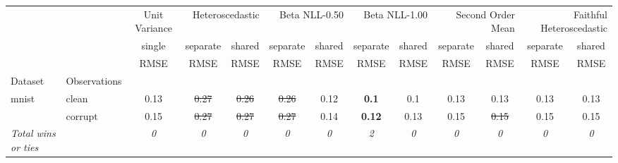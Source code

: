 \begin{tabular}{ll|c|cc|cc|cc|cc|cc}
\toprule
{} & {} & {Unit Variance} & \multicolumn{2}{r}{Heteroscedastic} & \multicolumn{2}{r}{Beta NLL-0.50} & \multicolumn{2}{r}{Beta NLL-1.00} & \multicolumn{2}{r}{Second Order Mean} & \multicolumn{2}{r}{Faithful Heteroscedastic} \\
{} & {} & {single} & {separate} & {shared} & {separate} & {shared} & {separate} & {shared} & {separate} & {shared} & {separate} & {shared} \\
{} & {} & {RMSE} & {RMSE} & {RMSE} & {RMSE} & {RMSE} & {RMSE} & {RMSE} & {RMSE} & {RMSE} & {RMSE} & {RMSE} \\
{Dataset} & {Observations} & {} & {} & {} & {} & {} & {} & {} & {} & {} & {} & {} \\
\midrule
\multirow[t]{2}{*}{mnist} & clean & 0.13 & \sout{0.27} & \sout{0.26} & \sout{0.26} & 0.12 & \textbf{0.1} & 0.1 & 0.13 & 0.13 & 0.13 & 0.13 \\
 & corrupt & 0.15 & \sout{0.27} & \sout{0.27} & \sout{0.27} & 0.14 & \textbf{0.12} & 0.13 & 0.15 & \sout{0.15} & 0.15 & 0.15 \\
\textit{{Total wins or ties}} &  & \textit{0} & \textit{0} & \textit{0} & \textit{0} & \textit{0} & \textit{2} & \textit{0} & \textit{0} & \textit{0} & \textit{0} & \textit{0} \\
\bottomrule
\end{tabular}
